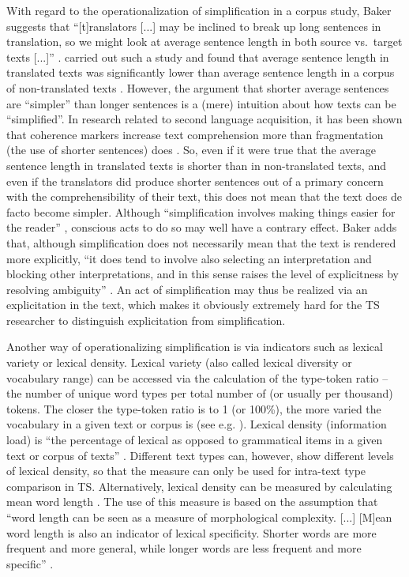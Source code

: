 With regard to the operationalization of simplification in a corpus study, Baker suggests that “[t]ranslators [...] may be inclined to break up long sentences in translation, so we might look at average sentence length in both source vs.\ target texts [...]” \citep[181]{baker_corpus-based_1996}. \citet{thelen_comparable_1996} carried out such a study and found that average sentence length in translated texts was significantly lower than average sentence length in a corpus of non-translated texts \citep[181]{baker_corpus-based_1996}. However, the argument that shorter average sentences are “simpler” than longer sentences is a (mere) intuition about how texts can be “simplified”. In research related to second language acquisition, it has been shown that coherence markers increase text comprehension more than fragmentation (the use of shorter sentences) does \citep{land_zwakke_2009}. So, even if it were true that the average sentence length in translated texts is shorter than in non-translated texts, and even if the translators did produce shorter sentences out of a primary concern with the comprehensibility of their text, this does not mean that the text does de facto become simpler. Although “simplification involves making things easier for the reader” \citep[182]{baker_corpus-based_1996}, conscious acts to do so may well have a contrary effect. Baker adds that, although simplification does not necessarily mean that the text is rendered more explicitly, “it does tend to involve also selecting an interpretation and blocking other interpretations, and in this sense raises the level of explicitness by resolving ambiguity” \citep[182]{baker_corpus-based_1996}. An act of simplification may thus be realized via an explicitation in the text, which makes it obviously extremely hard for the TS researcher to distinguish explicitation from simplification.

Another way of operationalizing simplification is via indicators such as lexical variety or lexical density. Lexical variety (also called lexical diversity or vocabulary range) can be accessed via the calculation of the type-token ratio – the number of unique word types per total number of (or usually per thousand) tokens. The closer the type-token ratio is to 1 (or 100\%), the more varied the vocabulary in a given text or corpus is (see e.g. \citealt{laviosa_core_1998}). Lexical density (information load) is “the percentage of lexical as opposed to grammatical items in a given text or corpus of texts” \citep[237]{baker_corpora_1995}. Different text types can, however, show different levels of lexical density, so that the measure can only be used for intra-text type comparison in TS. Alternatively, lexical density can be measured by calculating mean word length \citep{Kruger2012}. The use of this measure is based on the assumption that “word length can be seen as a measure of morphological complexity. [...] [M]ean word length is also an indicator of lexical specificity. Shorter words are more frequent and more general, while longer words are less frequent and more specific” \citep[366]{Kruger2012}.

